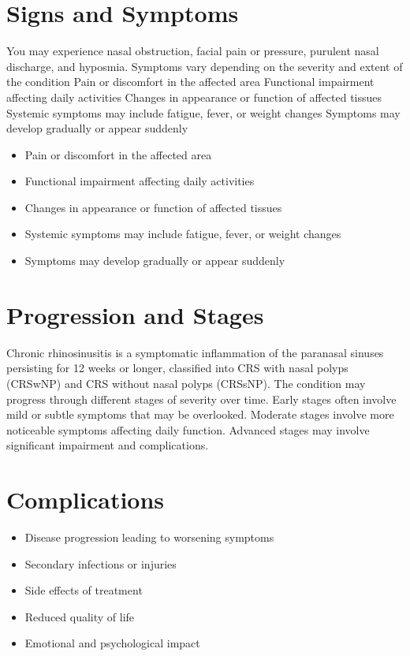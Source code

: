 \section{Signs and Symptoms}
You may experience nasal obstruction, facial pain or pressure, purulent nasal discharge, and hyposmia. Symptoms vary depending on the severity and extent of the condition Pain or discomfort in the affected area Functional impairment affecting daily activities Changes in appearance or function of affected tissues Systemic symptoms may include fatigue, fever, or weight changes Symptoms may develop gradually or appear suddenly

\begin{itemize}[noitemsep]
  \item Pain or discomfort in the affected area
  \item Functional impairment affecting daily activities
  \item Changes in appearance or function of affected tissues
  \item Systemic symptoms may include fatigue, fever, or weight changes
  \item Symptoms may develop gradually or appear suddenly
\end{itemize}
\section{Progression and Stages}
Chronic rhinosinusitis is a symptomatic inflammation of the paranasal sinuses persisting for 12 weeks or longer, classified into CRS with nasal polyps (CRSwNP) and CRS without nasal polyps (CRSsNP). The condition may progress through different stages of severity over time. Early stages often involve mild or subtle symptoms that may be overlooked. Moderate stages involve more noticeable symptoms affecting daily function. Advanced stages may involve significant impairment and complications.
\section{Complications}
\begin{itemize}[noitemsep]
  \item Disease progression leading to worsening symptoms
  \item Secondary infections or injuries
  \item Side effects of treatment
  \item Reduced quality of life
  \item Emotional and psychological impact
\end{itemize}
